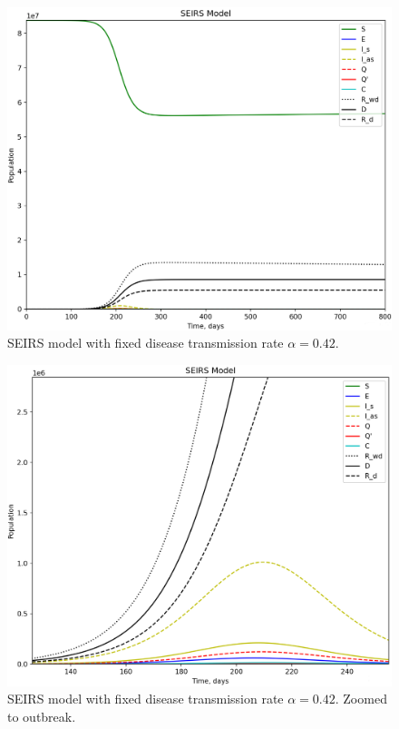 \documentclass[12pt, a4paper]{article}
\begin{document}
	\begin{figure}[h!]
		\centering
		\includegraphics[width=12cm]{seirs.png}
		\caption{SEIRS model with fixed disease transmission rate $\alpha = 0.42$.}
	\end{figure}

	\newpage

	\begin{figure}[h!]
		\centering
		\includegraphics[width=12cm]{seirs_2.png}
		\caption{SEIRS model with fixed disease transmission rate $\alpha = 0.42$. Zoomed to outbreak.}
	\end{figure}
\end{document}
